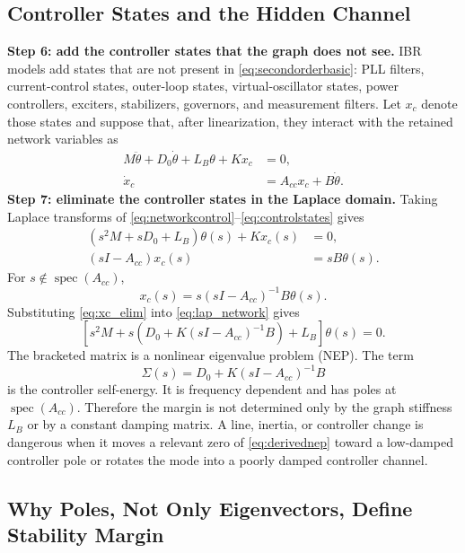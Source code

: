 \documentclass[conference]{IEEEtran}
\newcommand{\spec}{\operatorname{spec}}
\begin{document}
\subsection{Controller States and the Hidden Channel}

\noindent\textbf{Step 6: add the controller states that the graph does not see.}
IBR models add states that are not present in \eqref{eq:secondorderbasic}:
PLL filters, current-control states, outer-loop states, virtual-oscillator
states, power controllers, exciters, stabilizers, governors, and measurement
filters. Let $x_c$ denote those states and suppose that, after linearization,
they interact with the retained network variables as
\begin{align}
  M\ddot\theta+D_0\dot\theta+L_B\theta+Kx_c&=0,
  \label{eq:networkcontrol}\\
  \dot x_c&=A_{cc}x_c+B\dot\theta .
  \label{eq:controlstates}
\end{align}
\noindent\textbf{Step 7: eliminate the controller states in the Laplace domain.}
Taking Laplace transforms of \eqref{eq:networkcontrol}--\eqref{eq:controlstates}
gives
\begin{align}
  (s^2M+sD_0+L_B)\theta(s)+Kx_c(s)&=0,
  \label{eq:lap_network}\\
  (sI-A_{cc})x_c(s)&=sB\theta(s).
  \label{eq:lap_control}
\end{align}
For $s\notin\spec(A_{cc})$,
\begin{equation}
  x_c(s)=s(sI-A_{cc})^{-1}B\theta(s).
  \label{eq:xc_elim}
\end{equation}
Substituting \eqref{eq:xc_elim} into \eqref{eq:lap_network} gives
\begin{equation}
  \left[
  s^2M+s\left(D_0+K(sI-A_{cc})^{-1}B\right)+L_B
  \right]\theta(s)=0 .
  \label{eq:derivednep}
\end{equation}
The bracketed matrix is a nonlinear eigenvalue problem (NEP). The term
\begin{equation}
  \Sigma(s)=D_0+K(sI-A_{cc})^{-1}B
  \label{eq:sigmadef_intro}
\end{equation}
is the controller self-energy. It is frequency dependent and has poles at
$\spec(A_{cc})$. Therefore the margin is not determined only by the graph
stiffness $L_B$ or by a constant damping matrix. A line, inertia, or controller
change is dangerous when it moves a relevant zero of \eqref{eq:derivednep}
toward a low-damped controller pole or rotates the mode into a poorly damped
controller channel.

\subsection{Why Poles, Not Only Eigenvectors, Define Stability Margin}
\end{document}
